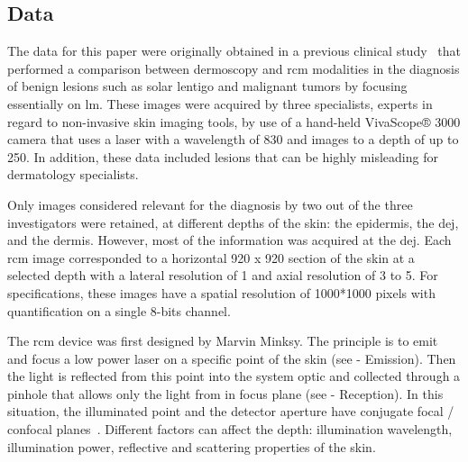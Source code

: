 \documentclass[journal,article,submit,moreauthors,pdftex, applsci]{Definitions/mdpi}
\begin{document}
\subsection{Data}
\label{sec:data}
The data for this paper were originally obtained in a previous clinical study~\cite{Cinotti2018} that performed a comparison between dermoscopy and \ac{rcm} modalities in the diagnosis of benign lesions such as solar lentigo and malignant tumors by focusing essentially on \ac{lm}. These images were acquired by three specialists, experts in regard to non-invasive skin imaging tools, by use of a hand-held VivaScope® 3000 camera that uses a laser with a wavelength of \unit{830}{\nano\meter} and images to a depth of up to \unit{250}{\micro\meter}. In addition, these data included lesions that can be highly misleading for dermatology specialists.\par
Only images considered relevant for the diagnosis by two out of the three investigators were retained, at different depths of the skin: the epidermis, the \ac{dej}, and the dermis. However, most of the information was acquired at the \ac{dej}. Each \ac{rcm} image corresponded to a horizontal \unit{920}{\micro\meter} x \unit{920}{\micro\meter} section of the skin at a selected depth with a lateral resolution of \unit{1}{\micro\meter} and axial resolution of \unit{3}{\micro\meter} to \unit{5}{\micro\meter}. For specifications, these images have a spatial resolution of 1000*1000 pixels with quantification on a single 8-bits channel.\par
The \ac{rcm} device was first designed by Marvin Minksy. The principle is to emit and focus a low power laser on a specific point of the skin (see  - Emission). Then the light is reflected from this point into the system optic and collected through a pinhole that allows only the light from in focus plane (see  - Reception). In this situation, the illuminated point and the detector aperture have conjugate focal / confocal planes~\cite{Nehal2008a}. Different factors can affect the depth: illumination wavelength, illumination power, reflective and scattering properties of the skin.\par
\end{document}
